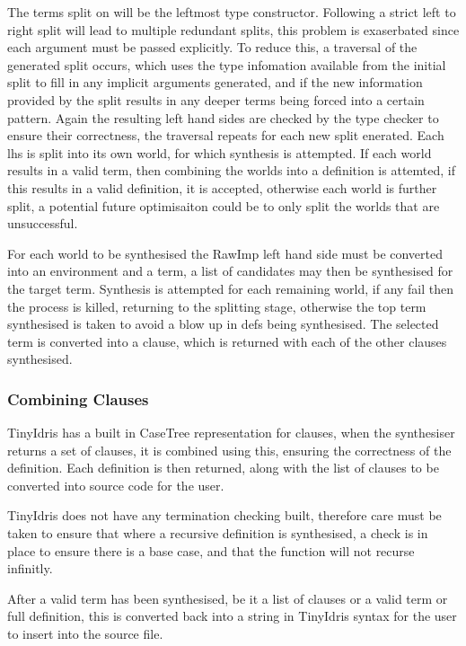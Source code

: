 \documentclass[a4paper]{article}
\begin{document}
The terms split on will be the leftmost type constructor. Following a strict 
left to right split will lead to multiple redundant splits, this problem is 
exaserbated since each argument must be passed explicitly. To reduce this, 
a traversal of the generated split occurs, which uses the type infomation 
available from the initial split to fill in any implicit arguments generated, 
and if the new information provided by the split results in any deeper terms 
being forced into a certain pattern. Again the resulting left hand sides are
checked by the type checker to ensure their correctness, the traversal repeats for
each new split enerated. Each lhs is split
into its own world, for which synthesis is attempted. If each world results 
in a valid term, then combining the worlds into a definition is attemted, if this
results in a valid definition, it is accepted, otherwise each world is further
split, a potential future optimisaiton could be to only split the worlds that are 
unsuccessful.

For each world to be synthesised the RawImp left hand side must be 
converted into an environment and a term, a list of candidates may then be 
synthesised for the target term. Synthesis is attempted for each remaining world, 
if any fail then the process is killed, returning to the splitting stage, otherwise the top term synthesised
is taken to avoid a blow up in defs being synthesised. The selected term is
converted into a clause, which is returned with each of the other clauses synthesised. 

\subsubsection{Combining Clauses}
\label{sec:org909acde}
TinyIdris has a built in CaseTree representation for clauses, when the synthesiser
returns a set of clauses, it is combined using this, ensuring the correctness
of the definition. Each definition is then returned, along with the list of clauses
to be converted into source code for the user.

TinyIdris does not have any termination checking built, therefore care
must be taken to ensure that where a recursive definition is synthesised,
a check is in place to ensure there is a base case, and that the function
will not recurse infinitly. 

After a valid term has been synthesised, be it a list of clauses or a valid term or 
full definition, this is converted back into a string in TinyIdris syntax for
the user to insert into the source file. 
\end{document}
